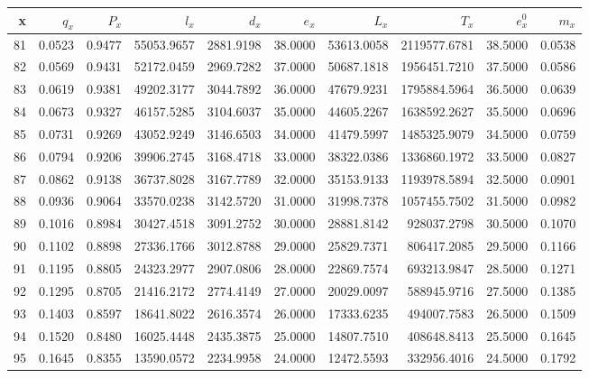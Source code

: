 \documentclass[11pt]{article}
\begin{document}
\begin{tabular}{|r|r|r|r|r|r|r|r|r|r|}
	\hline
	\textbf{x} &     \textbf{$q_{x}$} &     \textbf{$P_{x}$} &          \textbf{$l_{x}$} &        \textbf{$d_{x}$} &       \textbf{$e_{x}$} &         \textbf{$L_{x}$} &            \textbf{$T_{x}$} &      \textbf{$e_{x}^{ 0}$} &            \textbf{$m_{x}$}  \\
	\hline 
  81 & 0.0523 & 0.9477 &  55053.9657 & 2881.9198 &  38.0000 & 53613.0058 &  2119577.6781 &  38.5000 & 0.0538 \\
82 & 0.0569 & 0.9431 &  52172.0459 & 2969.7282 &  37.0000 & 50687.1818 &  1956451.7210 &  37.5000 & 0.0586 \\
83 & 0.0619 & 0.9381 &  49202.3177 & 3044.7892 &  36.0000 & 47679.9231 &  1795884.5964 &  36.5000 & 0.0639 \\
84 & 0.0673 & 0.9327 &  46157.5285 & 3104.6037 &  35.0000 & 44605.2267 &  1638592.2627 &  35.5000 & 0.0696 \\
85 & 0.0731 & 0.9269 &  43052.9249 & 3146.6503 &  34.0000 & 41479.5997 &  1485325.9079 &  34.5000 & 0.0759 \\
86 & 0.0794 & 0.9206 &  39906.2745 & 3168.4718 &  33.0000 & 38322.0386 &  1336860.1972 &  33.5000 & 0.0827 \\
87 & 0.0862 & 0.9138 &  36737.8028 & 3167.7789 &  32.0000 & 35153.9133 &  1193978.5894 &  32.5000 & 0.0901 \\
88 & 0.0936 & 0.9064 &  33570.0238 & 3142.5720 &  31.0000 & 31998.7378 &  1057455.7502 &  31.5000 & 0.0982 \\
89 & 0.1016 & 0.8984 &  30427.4518 & 3091.2752 &  30.0000 & 28881.8142 &   928037.2798 &  30.5000 & 0.1070 \\
90 & 0.1102 & 0.8898 &  27336.1766 & 3012.8788 &  29.0000 & 25829.7371 &   806417.2085 &  29.5000 & 0.1166 \\
91 & 0.1195 & 0.8805 &  24323.2977 & 2907.0806 &  28.0000 & 22869.7574 &   693213.9847 &  28.5000 & 0.1271 \\
92 & 0.1295 & 0.8705 &  21416.2172 & 2774.4149 &  27.0000 & 20029.0097 &   588945.9716 &  27.5000 & 0.1385 \\
93 & 0.1403 & 0.8597 &  18641.8022 & 2616.3574 &  26.0000 & 17333.6235 &   494007.7583 &  26.5000 & 0.1509 \\
94 & 0.1520 & 0.8480 &  16025.4448 & 2435.3875 &  25.0000 & 14807.7510 &   408648.8413 &  25.5000 & 0.1645 \\
95 & 0.1645 & 0.8355 &  13590.0572 & 2234.9958 &  24.0000 & 12472.5593 &   332956.4016 &  24.5000 & 0.1792 \\

\end{tabular}
\end{document}
